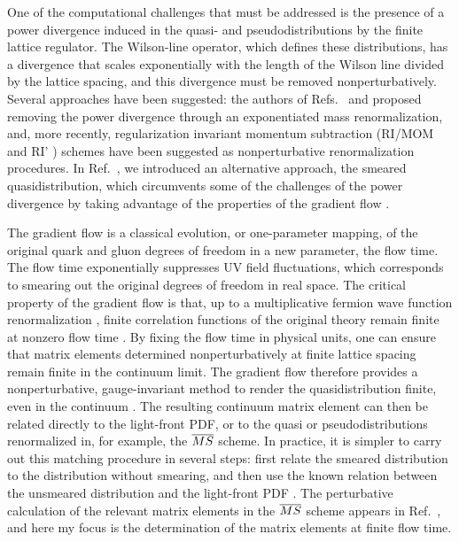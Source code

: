 One of the computational challenges that must be addressed is the presence of a power divergence induced in the quasi- and pseudodistributions by the finite lattice regulator. The Wilson-line operator, which defines these distributions, has a divergence that scales exponentially with the length of the Wilson line divided by the lattice spacing, and this divergence must be removed nonperturbatively. Several approaches have been suggested: the authors of Refs.~\cite{Chen:2016fxx} and \cite{Ishikawa:2016znu} proposed removing the power divergence through an exponentiated mass renormalization, and, more recently, regularization invariant momentum subtraction (RI/MOM \cite{Chen:2017mzz} and RI' \cite{Alexandrou:2017huk}) schemes have been suggested as nonperturbative renormalization procedures. In Ref.~\cite{Monahan:2016bvm}, we introduced an alternative approach, the smeared quasidistribution, which circumvents some of the challenges of the power divergence by taking advantage of the properties of the gradient flow \cite{Narayanan:2006rf,Luscher:2011bx,Luscher:2013cpa}.

The gradient flow is a classical evolution, or one-parameter mapping, of the original quark and gluon degrees of freedom in a new parameter, the flow time. The flow time exponentially suppresses UV field fluctuations, which corresponds to smearing out the original degrees of freedom in real space. The critical property of the gradient flow is that, up to a multiplicative fermion wave function renormalization \cite{Luscher:2013cpa}, finite correlation functions of the original theory remain finite at nonzero flow time \cite{Luscher:2011bx}. By fixing the flow time in physical units, one can ensure that matrix elements determined nonperturbatively at finite lattice spacing remain finite in the continuum limit. The gradient flow therefore provides a nonperturbative, gauge-invariant method to render the quasidistribution finite, even in the continuum \cite{Monahan:2016bvm}. The resulting continuum matrix element can then be related directly to the light-front PDF, or to the quasi or pseudodistributions renormalized in, for example, the $\overline{MS}$ scheme. In practice, it is simpler to carry out this matching procedure in several steps: first relate the smeared distribution to the distribution without smearing, and then use the known relation between the unsmeared distribution and the light-front PDF \cite{Xiong:2013bka,Ji:2015jwa,Wang:2017qyg,Stewart:2017tvs}. The perturbative calculation of the relevant matrix elements in the $\overline{MS}$ scheme appears in Ref.~\cite{Constantinou:2017sej}, and here my focus is the determination of the matrix elements at finite flow time.

